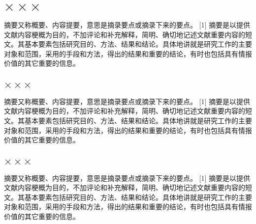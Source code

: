 \documentclass[12pt,oneside,a4paper,fleqn]{ctexart}
\begin{document}
\newpage
\tableofcontents
{}




\thispagestyle{empty}
\newpage
\setcounter{page}{1}

\vspace{0.5em} {\heiti \section{ $\times \times \times $}} \vspace{0.5em}\begin{spacing}{1.25}


摘要又称概要、内容提要，意思是摘录要点或摘录下来的要点。 [1]  摘要是以提供文献内容梗概为目的，不加评论和补充解释，简明、确切地记述文献重要内容的短文。其基本要素包括研究目的、方法、结果和结论。具体地讲就是研究工作的主要对象和范围，采用的手段和方法，得出的结果和重要的结论，有时也包括具有情报价值的其它重要的信息。


\end{spacing}\vspace{0.5em} {\heiti \subsection{ $\times \times \times $}}\begin{spacing}{1.25}

摘要又称概要、内容提要，意思是摘录要点或摘录下来的要点。 [1]  摘要是以提供文献内容梗概为目的，不加评论和补充解释，简明、确切地记述文献重要内容的短文。其基本要素包括研究目的、方法、结果和结论。具体地讲就是研究工作的主要对象和范围，采用的手段和方法，得出的结果和重要的结论，有时也包括具有情报价值的其它重要的信息。


\end{spacing}\vspace{0.5em} {\heiti \subsection{ $\times \times \times $}}\begin{spacing}{1.25}

摘要又称概要、内容提要，意思是摘录要点或摘录下来的要点。 [1]  摘要是以提供文献内容梗概为目的，不加评论和补充解释，简明、确切地记述文献重要内容的短文。其基本要素包括研究目的、方法、结果和结论。具体地讲就是研究工作的主要对象和范围，采用的手段和方法，得出的结果和重要的结论，有时也包括具有情报价值的其它重要的信息。



\end{spacing}
\end{document}
